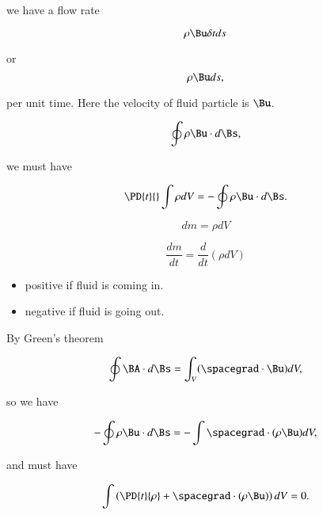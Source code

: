 we have a flow rate

\begin{equation}\label{eqn:continuumL9:310}
\rho \Bu \delta t ds
\end{equation}

or 
\begin{equation}\label{eqn:continuumL9:330}
\rho \Bu ds,
\end{equation}

per unit time.  Here the velocity of fluid particle is $\Bu$.

\begin{equation}\label{eqn:continuumL9:350}
\oint \rho \Bu \cdot d\Bs,
\end{equation}

we must have

\begin{equation}\label{eqn:continuumL9:710}
\PD{t}{} \int \rho dV 
=
-\oint \rho \Bu \cdot d\Bs.
\end{equation}

\begin{equation}\label{eqn:continuumL9:370}
dm = \rho dV
\end{equation}

\begin{equation}\label{eqn:continuumL9:390}
\frac{dm}{dt} = \frac{d}{dt} (\rho dV)
\end{equation}

\begin{itemize}
\item 
positive if fluid is coming in.
\item 
negative if fluid is going out.
\end{itemize}

By Green's theorem

\begin{equation}\label{eqn:continuumL9:410}
\oint \BA \cdot d\Bs = \int_V (\spacegrad \cdot \Bu) dV,
\end{equation}

so we have

\begin{equation}\label{eqn:continuumL9:430}
-\oint \rho \Bu \cdot d\Bs = -\int \spacegrad \cdot (\rho \Bu ) dV,
\end{equation}

and must have

\begin{equation}\label{eqn:continuumL9:450}
\int \left( \PD{t}{\rho} + \spacegrad \cdot (\rho \Bu) \right) dV = 0.
\end{equation}

